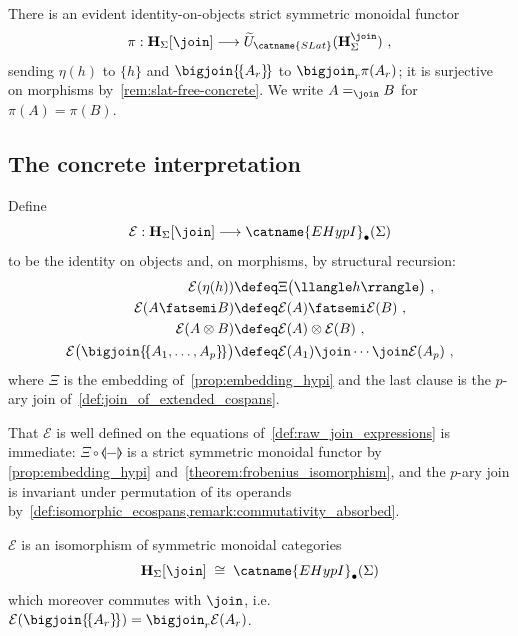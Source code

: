 There is an evident identity-on-objects strict symmetric monoidal functor
\[
\pi : \mathbf{H}_{\Sigma}[\join] \longrightarrow
\widetilde{U}_{\catname{SLat}}(\mathbf{H}^{\join}_{\Sigma})~,
\]
sending $\eta(h)$ to $\{h\}$ and $\bigjoin\{\!\{A_{r}\}\!\}$ to
$\bigjoin_{r} \pi(A_{r})$; it is surjective on morphisms
by~\cref{rem:slat-free-concrete}.
We write $A =_{\join} B$ for $\pi(A) = \pi(B)$.

\subsection{The concrete interpretation}

\begin{definition}\label{def:concrete_interpretation}
Define
\[
\mathcal{E} : \mathbf{H}_{\Sigma}[\join] \longrightarrow \catname{EHypI}_{\bullet}(\Sigma)
\]
to be the identity on objects and, on morphisms, by structural recursion:
\begin{align*}
\mathcal{E}(\eta(h)) &\defeq \Xi\bigl(\llangle h \rrangle\bigr)~,\\
\mathcal{E}(A \fatsemi B) &\defeq \mathcal{E}(A) \fatsemi \mathcal{E}(B)~,\\
\mathcal{E}(A \otimes B) &\defeq \mathcal{E}(A) \otimes \mathcal{E}(B)~,\\
\mathcal{E}\bigl(\bigjoin\{\!\{A_{1}, \ldots, A_{p}\}\!\}\bigr)
  &\defeq \mathcal{E}(A_{1}) \join \cdots \join \mathcal{E}(A_{p})~,
\end{align*}
where $\Xi$ is the embedding of~\cref{prop:embedding_hypi} and the last clause is the
$p$-ary join of~\cref{def:join_of_extended_cospans}.
\end{definition}

That $\mathcal{E}$ is well defined on the equations of~\cref{def:raw_join_expressions} is
immediate: $\Xi \circ \llangle - \rrangle$ is a strict symmetric monoidal functor by
\cref{prop:embedding_hypi} and~\cref{theorem:frobenius_isomorphism}, and the $p$-ary join
is invariant under permutation of its operands
by~\cref{def:isomorphic_ecospans,remark:commutativity_absorbed}.

\begin{theorem}\label{theorem:concrete_representation}
$\mathcal{E}$ is an isomorphism of symmetric monoidal categories
\[
\mathbf{H}_{\Sigma}[\join] \;\cong\; \catname{EHypI}_{\bullet}(\Sigma)
\]
which moreover commutes with $\join$, i.e.\
$\mathcal{E}(\bigjoin\{\!\{A_{r}\}\!\}) = \bigjoin_{r} \mathcal{E}(A_{r})$.
\end{theorem}

